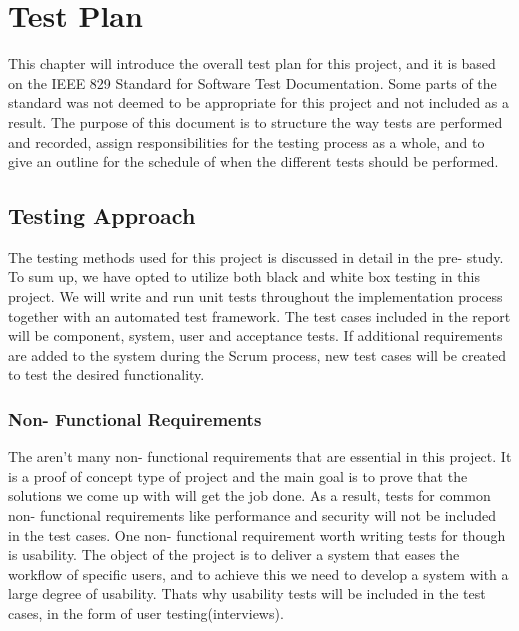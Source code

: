 \chapter{Test Plan}

\minitoc

This chapter will introduce the overall test plan for this project, and it is based on the IEEE 829 Standard for Software Test Documentation\cite{testing-standard}. Some parts of the standard was not deemed to be appropriate for this project and not included as a result. The purpose of this document is to structure the way tests are performed and recorded, assign responsibilities for the testing process as a whole, and to give an outline for the schedule of when the different tests should be performed.

\clearpage

\section{Testing Approach}
The testing methods used for this project is discussed in detail in the pre- study. To sum up, we have opted to utilize both black and white box testing in this project. We will write and run unit tests throughout the implementation process together with an automated test framework. The test cases included in the report will be component, system, user and acceptance tests. If additional requirements are added to the system during the Scrum process, new test cases will be created to test the desired functionality.

\subsection{Non- Functional Requirements}
The aren't many non- functional requirements that are essential in this project. It is a proof of concept type of project and the main goal is to prove that the solutions we come up with will get the job done. As a result, tests for common non- functional requirements like performance and security will not be included in the test cases. One non- functional requirement worth writing tests for though is usability. The object of the project is to deliver a system that eases the workflow of specific users, and to achieve this we need to develop a system with a large degree of usability. Thats why usability tests will be included in the test cases, in the form of user testing(interviews).

